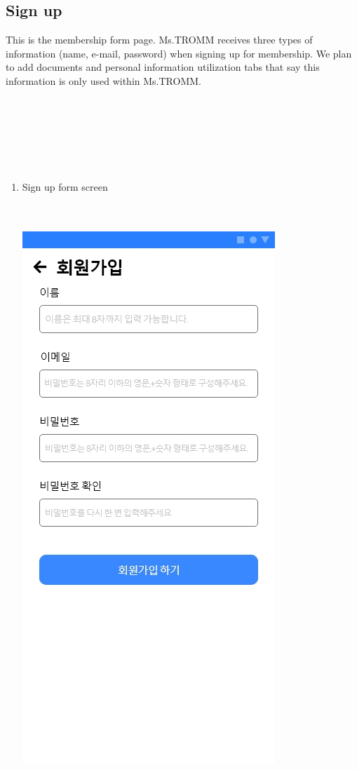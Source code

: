 \documentclass[conference]{IEEEtran}
\begin{document}
\subsection{Sign up}
This is the membership form page. Ms.TROMM receives three types of information (name, e-mail, password) when signing up for membership. We plan to add documents and personal information utilization tabs that say this information is only used within Ms.TROMM. \\ \\ \\ \\ \\ \\ \\

\begin{enumerate} 
    \item Sign up form screen \\ \\ \\
    \centerline{\includegraphics[scale=0.30]{4. 회원가입.jpg}}

\end{enumerate}
\end{document}
